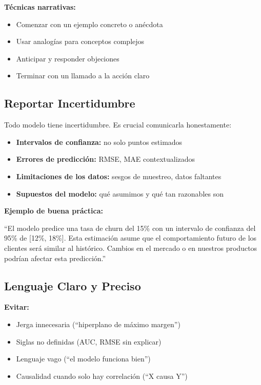 \documentclass[11pt,a4paper]{article}
\begin{document}
\textbf{Técnicas narrativas:}
\begin{itemize}
\item Comenzar con un ejemplo concreto o anécdota
\item Usar analogías para conceptos complejos
\item Anticipar y responder objeciones
\item Terminar con un llamado a la acción claro
\end{itemize}

\subsection{Reportar Incertidumbre}

Todo modelo tiene incertidumbre. Es crucial comunicarla honestamente:

\begin{itemize}
\item \textbf{Intervalos de confianza:} no solo puntos estimados
\item \textbf{Errores de predicción:} RMSE, MAE contextualizados
\item \textbf{Limitaciones de los datos:} sesgos de muestreo, datos faltantes
\item \textbf{Supuestos del modelo:} qué asumimos y qué tan razonables son
\end{itemize}

\textbf{Ejemplo de buena práctica:}

``El modelo predice una tasa de churn del 15\% con un intervalo de confianza del 95\% de [12\%, 18\%]. Esta estimación asume que el comportamiento futuro de los clientes será similar al histórico. Cambios en el mercado o en nuestros productos podrían afectar esta predicción.''

\subsection{Lenguaje Claro y Preciso}

\textbf{Evitar:}
\begin{itemize}
\item Jerga innecesaria (``hiperplano de máximo margen'')
\item Siglas no definidas (AUC, RMSE sin explicar)
\item Lenguaje vago (``el modelo funciona bien'')
\item Causalidad cuando solo hay correlación (``X causa Y'')
\end{itemize}
\end{document}

